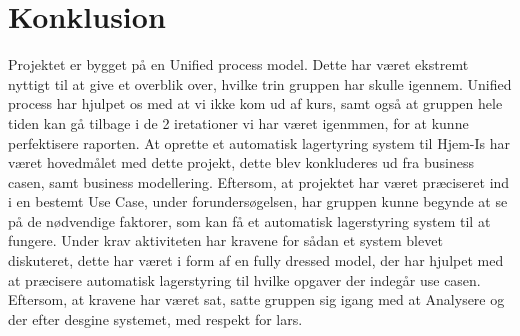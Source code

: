 \chapter{Konklusion}\label{ch:konklusion}

Projektet er bygget på en Unified process model. Dette har været ekstremt nyttigt til at give et overblik over, hvilke trin gruppen har skulle igennem. Unified process har hjulpet os med at vi ikke kom ud af kurs, samt også at gruppen hele tiden kan gå tilbage i de 2 iretationer vi har været igenmmen, for at kunne perfektisere raporten. 
At oprette et automatisk lagertyring system til Hjem-Is har været hovedmålet med dette projekt, dette blev konkluderes ud fra business casen, samt business modellering. Eftersom, at projektet har været præciseret ind i en bestemt Use Case, under forundersøgelsen, har gruppen kunne begynde at se på de nødvendige faktorer, som kan få et automatisk lagerstyring system til at fungere. 
Under krav aktiviteten har kravene for sådan et system blevet diskuteret, dette har været i form af en fully dressed model, der har hjulpet med at præcisere automatisk lagerstyring til hvilke opgaver der indegår use casen. Eftersom, at kravene har været sat, satte gruppen sig igang med at Analysere og der efter desgine systemet, med respekt for lars. 



